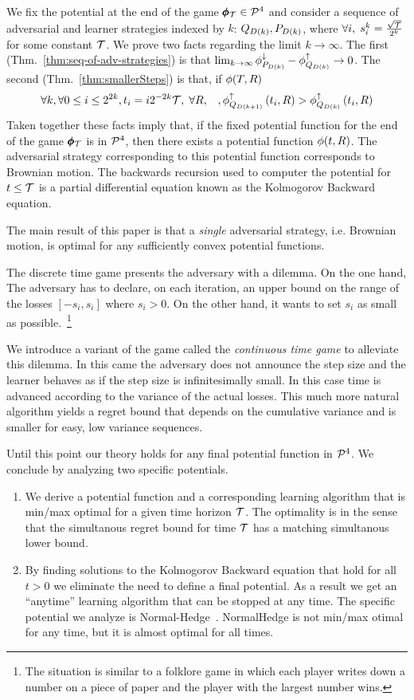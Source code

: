\documentclass{article}[12pt]
\begin{document}
We fix the potential at the end of the game $\pmb{\phi}_{\mathcal{T}} \in {\cal P}^{4}$
and consider a sequence of adversarial and learner strategies indexed
by $k$: $Q_{D(k)},P_{D(k)}$, where
$\forall i,\; s^k_i = \frac{\sqrt{\mathcal{T}}}{2^k}$ for some constant
$\mathcal{T}$. We prove two facts regarding the limit $k \to \infty$.  The
first (Thm.~\ref{thm:seq-of-adv-strategies}) is that
$\lim_{k \to \infty}\phi_{P_{D(k)}}^{\downarrow} - \phi_{Q_{D(k)}}^{\uparrow} \to 0$.  The second
(Thm.~\ref{thm:smallerSteps}) is that, if $\phi(T,R)$
$$\forall k, \forall 0\leq i \leq 2^{2k},t_i=i 2^{-2k} \mathcal{T},\; \forall R,\;\;\;
,\phi_{Q_{D(k+1)}}^{\uparrow}\left(t_i,R\right) >
\phi_{Q_{D(k)}}^{\uparrow}\left(t_i,R\right)$$ Taken together these facts imply
that, if the fixed potential function for the end of the game
$\pmb{\phi}_{\mathcal{T}}$ is in ${\cal P}^{4}$, then there exists a potential function
$\phi(t,R)$. The adversarial strategy corresponding to this potential
function corresponds to Brownian motion.  The backwards recursion used
to computer the potential for $t \leq \mathcal{T}$ is a partial
differential equation known as the Kolmogorov Backward equation.

The main result of this paper is that a {\em single} adversarial
strategy, i.e. Brownian motion, is optimal for any
sufficiently convex potential functions.

The discrete time game presents the adversary with a dilemma.  On the
one hand, The adversary has to declare, on each iteration, an upper bound on the
range of the losses $[-s_i,s_i]$ where $s_i>0$. On the other hand, it
wants to set $s_i$ as small as possible.~\footnote{The situation is
  similar to a folklore game in which each player writes down a number
  on a piece of paper and the player with the largest number wins.}

We introduce a variant of the game called the {\em continuous time
  game} to alleviate this dilemma. In this came the adversary does not
announce the step size and the learner behaves as if
the step size is infinitesimally small. In this case time is advanced according
to the variance of the actual losses. This much more natural algorithm yields
a regret bound that depends on the cumulative variance and is smaller
for easy, low variance sequences.

Until this point our theory holds for any final potential function in ${\cal P}^{4}$. We conclude by analyzing two specific potentials.
\begin{enumerate}
\item We derive a potential function and a corresponding learning algorithm
  that is min/max optimal for a given time horizon $\mathcal{T}$.
  The optimality is in the sense that the
  simultanous regret bound for time $\mathcal{T}$ has a matching
  simultanous lower bound.
\item By finding solutions to the Kolmogorov Backward equation that
  hold for all $t>0$ we eliminate the need to define a final
  potential. As a result we get an ``anytime'' learning algorithm that
  can be stopped at any time. The specific potential we analyze is
  Normal-Hedge~\cite{}. NormalHedge is not min/max otimal for any
  time, but it is almost optimal for all times.
\end{enumerate}
\end{document}
